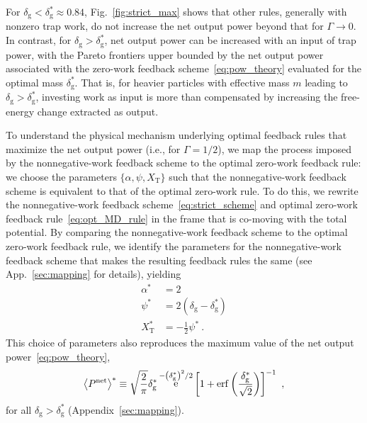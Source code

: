 \documentclass[%
reprint,
bibnotes, amsmath, amssymb, aps, pre,
 showkeys,
floatfix
]{revtex4-2}
\newcommand{\mrm}{\mathrm}
\newcommand{\pr}[1]{\left(#1\right)} %
\newcommand{\sr}[1]{\left[#1\right]} %
\newcommand{\dg}{\delta_{\mrm{g}}}
\newcommand{\epn}{\ev{P^{\mrm{net}}}}
\newcommand{\xT}{X_{\mrm{T}}}
\DeclareMathOperator{\e}{e}
\begin{document}
For $\dg < \dg^{*} \approx 0.84$, Fig.~\ref{fig:strict_max} shows that other rules, generally with nonzero trap work, do not increase the net output power beyond that for $\Gamma\to 0$. 
In contrast, for $\dg > \dg^{*}$, net output power can be increased with an input of trap power, with the Pareto frontiers upper bounded by the net output power associated with the zero-work feedback scheme~\eqref{eq:pow_theory} evaluated for the optimal mass $\dg^{*}$.
That is, for heavier particles with effective mass $m$ leading to $\dg > \dg^{*}$, investing work as input is more than compensated by increasing the free-energy change extracted as output.

To understand the physical mechanism underlying optimal feedback rules that maximize the net output power (i.e., for $\Gamma = 1/2$), we map the process imposed by the nonnegative-work feedback scheme to the optimal zero-work feedback rule: we choose the parameters $\{\alpha,\psi,\xT\}$ such that the nonnegative-work feedback scheme is equivalent to that of the optimal zero-work rule.
To do this, we rewrite the nonnegative-work feedback scheme~\eqref{eq:strict_scheme} and optimal zero-work feedback rule~\eqref{eq:opt_MD_rule} in the frame that is co-moving with the total potential. 
By comparing the nonnegative-work feedback scheme to the optimal zero-work feedback rule, we identify the parameters for the nonnegative-work feedback scheme that makes the resulting feedback rules the same (see App.~\ref{sec:mapping} for details), yielding
\begin{subequations}\label{eq:opt_net_output_params}
    \begin{align}
        \alpha^{*} &= 2\\
        \psi^{*} &= 2\pr{\dg-\dg^{*}} \label{eq:opt_net_output_params2}\\
        \xT^{*} &= -\frac{1}{2}\psi^{*} \label{eq:opt_net_output_params3}\ .
    \end{align}
\end{subequations}
This choice of parameters also reproduces the maximum value of the net output power~\eqref{eq:pow_theory}, 
\begin{align}
    \epn^{*} \equiv \sqrt{\frac{2}{\pi}}\dg^{*}\e^{-\pr{\dg^{*}}^{2}/2}\sr{1+\erf\pr{\frac{\dg^{*}}{\sqrt{2}}}}^{-1}\ ,\label{eq:pow_theory_max}
\end{align}
for all $\dg > \dg^{*}$ (Appendix~\ref{sec:mapping}).
\end{document}
